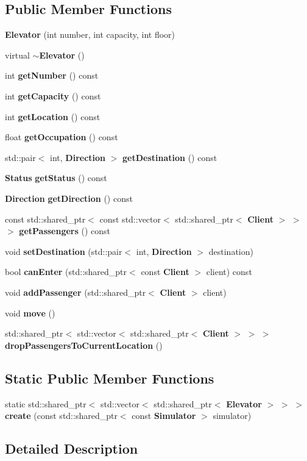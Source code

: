 \subsection*{Public Member Functions}
\begin{DoxyCompactItemize}
\item 
{\bf Elevator} (int number, int capacity, int floor)
\item 
virtual {\bf $\sim$\+Elevator} ()
\item 
int {\bf get\+Number} () const 
\item 
int {\bf get\+Capacity} () const 
\item 
int {\bf get\+Location} () const 
\item 
float {\bf get\+Occupation} () const 
\item 
std\+::pair$<$ int, {\bf Direction} $>$ {\bf get\+Destination} () const 
\item 
{\bf Status} {\bf get\+Status} () const 
\item 
{\bf Direction} {\bf get\+Direction} () const 
\item 
const std\+::shared\+\_\+ptr$<$ const std\+::vector$<$ std\+::shared\+\_\+ptr$<$ {\bf Client} $>$ $>$ $>$ {\bf get\+Passengers} () const 
\item 
void {\bf set\+Destination} (std\+::pair$<$ int, {\bf Direction} $>$ destination)
\item 
bool {\bf can\+Enter} (std\+::shared\+\_\+ptr$<$ const {\bf Client} $>$ client) const 
\item 
void {\bf add\+Passenger} (std\+::shared\+\_\+ptr$<$ {\bf Client} $>$ client)
\item 
void {\bf move} ()
\item 
std\+::shared\+\_\+ptr$<$ std\+::vector$<$ std\+::shared\+\_\+ptr$<$ {\bf Client} $>$ $>$ $>$ {\bf drop\+Passengers\+To\+Current\+Location} ()
\end{DoxyCompactItemize}
\subsection*{Static Public Member Functions}
\begin{DoxyCompactItemize}
\item 
static std\+::shared\+\_\+ptr$<$ std\+::vector$<$ std\+::shared\+\_\+ptr$<$ {\bf Elevator} $>$ $>$ $>$ {\bf create} (const std\+::shared\+\_\+ptr$<$ const {\bf Simulator} $>$ simulator)
\end{DoxyCompactItemize}


\subsection{Detailed Description}


